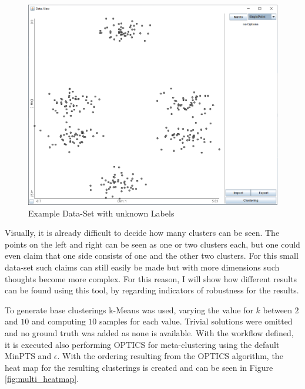 \documentclass[
	a4paper,
	english,
	twoside,
	openright,               
	11pt                            
	]{report}
\begin{document}
\begin{figure}[h]
	\centering
	\includegraphics[scale=.4]{multi}
	\caption{Example Data-Set with unknown Labels}
	\label{fig:multi}
\end{figure}

Visually, it is already difficult to decide how many clusters can be seen. The points on the left and right can be seen as one or two clusters each, but one could even claim that one side consists of one and the other two clusters. For this small data-set such claims can still easily be made but with more dimensions such thoughts become more complex. For this reason, I will show how different results can be found using this tool, by regarding indicators of robustness for the results.

To generate base clusterings k-Means was used, varying the value for $k$ between $2$ and $10$ and computing $10$ samples for each value. Trivial solutions were omitted and no ground truth was added as none is available. With the workflow defined, it is executed also performing OPTICS for meta-clustering using the default MinPTS and $\epsilon$. With the ordering resulting from the OPTICS algorithm, the heat map for the resulting clusterings is created and can be seen in Figure \ref{fig:multi_heatmap}.
\end{document}
